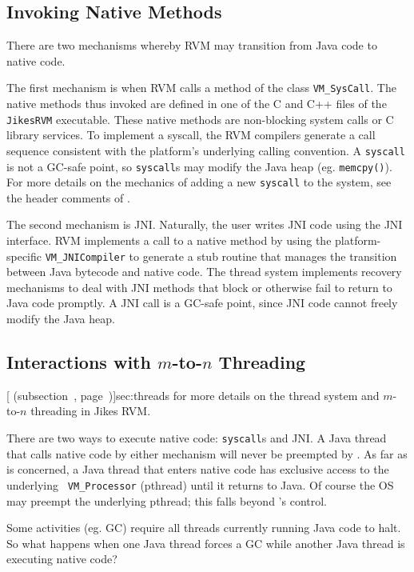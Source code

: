 \subsection{Invoking Native Methods}
There are two mechanisms whereby RVM may transition from Java code to native
code.

%
The first mechanism is when RVM calls a method of the class {\tt VM\_SysCall}.
The native methods thus invoked are defined in one of the
C and C++ files of the {\tt JikesRVM} executable. 
These native methods are non-blocking system calls or C library 
services.  To implement a syscall, the RVM compilers generate a call
sequence consistent with the platform's underlying calling convention.
A {\tt syscall} is not a GC-safe point, so {\tt syscall}s may modify the
Java heap (eg. {\tt memcpy()}). For more details on the mechanics of adding a
new \texttt{syscall} to the system, see the header comments of 
.

The second mechanism is JNI.  Naturally, the user writes JNI code
using the JNI interface.  RVM implements a call to a native method by
using the platform-specific {\tt VM\_JNICompiler} to generate a stub
routine that manages the transition between Java bytecode and native code.  The
thread system implements recovery mechanisms to deal with JNI methods
that block or otherwise fail to return to Java code promptly.  A JNI call
is a GC-safe point, since JNI code cannot freely modify the Java heap.

\subsection{Interactions with $m$-to-$n$ Threading}
[ (subsection~\Ref,
page~\Pageref)]{sec:threads} for more details on the thread system
and $m$-to-$n$ threading in Jikes RVM. 

There are two ways to execute native code: {\tt syscall}s and JNI.
A Java thread that calls native code by either mechanism will never
be preempted by \jrvm{}.  As far as \jrvm{} is concerned, a Java thread that
enters native code has exclusive access to the underlying {\tt
VM\_Processor} (pthread) until it returns to Java.  Of course the OS may preempt the underlying
pthread; this falls beyond \jrvm{}'s control.

Some activities (eg. GC) require all threads currently running Java code to halt.  
So what happens when one Java thread forces a GC while another Java thread is
executing native code?

